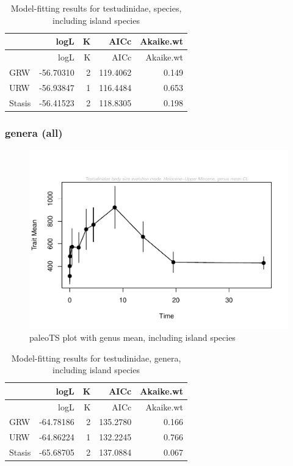 \documentclass[]{article}
\begin{document}
\begin{longtable}[]{@{}lrrrr@{}}
\caption{Model-fitting results for testudinidae, species, including
island species}\tabularnewline
\toprule
& logL & K & AICc & Akaike.wt\tabularnewline
\midrule
\endfirsthead
\toprule
& logL & K & AICc & Akaike.wt\tabularnewline
\midrule
\endhead
GRW & -56.70310 & 2 & 119.4062 & 0.149\tabularnewline
URW & -56.93847 & 1 & 116.4484 & 0.653\tabularnewline
Stasis & -56.41523 & 2 & 118.8305 & 0.198\tabularnewline
\bottomrule
\end{longtable}

\newpage

\subsubsection{genera (all)}\label{genera-all}

\begin{figure}[htbp]
\centering
\includegraphics{MA_JJ_files/figure-latex/paleoTS plot with genus mean, including island species-1.pdf}
\caption{paleoTS plot with genus mean, including island species}
\end{figure}

\begin{longtable}[]{@{}lrrrr@{}}
\caption{Model-fitting results for testudinidae, genera, including
island species}\tabularnewline
\toprule
& logL & K & AICc & Akaike.wt\tabularnewline
\midrule
\endfirsthead
\toprule
& logL & K & AICc & Akaike.wt\tabularnewline
\midrule
\endhead
GRW & -64.78186 & 2 & 135.2780 & 0.166\tabularnewline
URW & -64.86224 & 1 & 132.2245 & 0.766\tabularnewline
Stasis & -65.68705 & 2 & 137.0884 & 0.067\tabularnewline
\bottomrule
\end{longtable}
\end{document}

